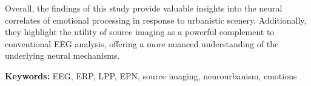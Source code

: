 Overall, the findings of this study provide valuable insights into the neural correlates of emotional processing in response to urbanistic scenery. Additionally, they highlight the utility of source imaging as a powerful complement to conventional EEG analysis, offering a more nuanced understanding of the underlying neural mechanisms.

\vfill

\textbf{\Large Keywords:} EEG, ERP, LPP, EPN, source imaging, neurourbanism, emotions

